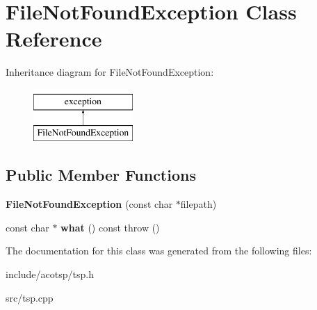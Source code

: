 \hypertarget{classFileNotFoundException}{\section{File\-Not\-Found\-Exception Class Reference}
\label{classFileNotFoundException}
}
Inheritance diagram for File\-Not\-Found\-Exception\-:\begin{figure}[H]
\begin{center}
\leavevmode
\includegraphics[height=2.000000cm]{classFileNotFoundException}
\end{center}
\end{figure}
\subsection*{Public Member Functions}
\begin{DoxyCompactItemize}
\item 
\hypertarget{classFileNotFoundException_aebc513d145a960de474b13189761872c}{{\bfseries File\-Not\-Found\-Exception} (const char $\ast$filepath)}\label{classFileNotFoundException_aebc513d145a960de474b13189761872c}

\item 
\hypertarget{classFileNotFoundException_afd2f2d5aad1f2f9573a92b4600b58963}{const char $\ast$ {\bfseries what} () const   throw ()}\label{classFileNotFoundException_afd2f2d5aad1f2f9573a92b4600b58963}

\end{DoxyCompactItemize}


The documentation for this class was generated from the following files\-:\begin{DoxyCompactItemize}
\item 
include/acotsp/tsp.\-h\item 
src/tsp.\-cpp\end{DoxyCompactItemize}
